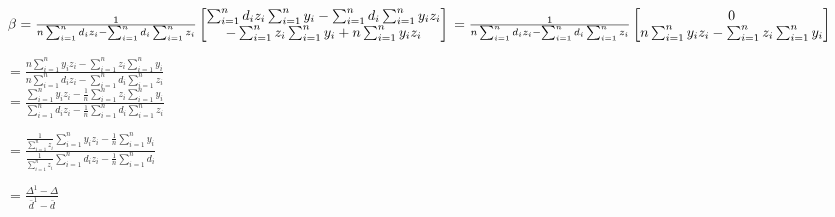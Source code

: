 \documentclass{article}
\begin{document}
\begin{enumerate}[label=(\alph*)]
	$\beta= \frac{1}{n \sum_{i=1}^{n} d_{i}z_{i} - \sum_{i=1}^{n} d_{i}\sum_{i=1}^{n} z_{i}}
	\begin{bmatrix}
	\sum_{i=1}^{n} d_{i}z_{i}\sum_{i=1}^{n} y_{i}  -\sum_{i=1}^{n} d_{i} \sum_{i=1}^{n} y_{i} z_{i}\\
	-\sum_{i=1}^{n} z_{i}\sum_{i=1}^{n} y_{i} + n \sum_{i=1}^{n} y_{i} z_{i}\\
	\end{bmatrix}
	\\
	=
	\frac{1}{n \sum_{i=1}^{n} d_{i}z_{i} - \sum_{i=1}^{n} d_{i}\sum_{i=1}^{n} z_{i}}
	\begin{bmatrix}
	0\\
	n \sum_{i=1}^{n} y_{i} z_{i}-\sum_{i=1}^{n} z_{i}\sum_{i=1}^{n} y_{i} \\
	\end{bmatrix}
	$
	
	$= \frac{n \sum_{i=1}^{n} y_{i} z_{i}-\sum_{i=1}^{n} z_{i}\sum_{i=1}^{n} y_{i}}
	{n \sum_{i=1}^{n} d_{i}z_{i} - \sum_{i=1}^{n} d_{i}\sum_{i=1}^{n} z_{i}}$ \\
	
	$= \frac{\sum_{i=1}^{n} y_{i} z_{i}- \frac{1}{n}\sum_{i=1}^{n} z_{i}\sum_{i=1}^{n} y_{i}}
	{\sum_{i=1}^{n} d_{i}z_{i} - \frac{1}{n}\sum_{i=1}^{n} d_{i}\sum_{i=1}^{n} z_{i}}$
	
	$= \frac{\frac{1}{\sum_{i=1}^{n} z_{i}}\sum_{i=1}^{n} y_{i} z_{i}- \frac{1}{n}\sum_{i=1}^{n} y_{i}}
	{\frac{1}{{\sum_{i=1}^{n} z_{i}}}\sum_{i=1}^{n} d_{i}z_{i} - \frac{1}{n}\sum_{i=1}^{n} d_{i}}$
	
	$= \frac{\Delta^{1} - \Delta}{\bar{d}^{1} - \bar{d}}$

\end{enumerate}
\end{document}

